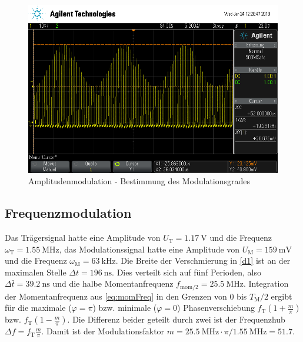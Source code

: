\begin{figure}
	\centering
	\includegraphics[width=\textwidth]{img/c_scope_247.png}
	\caption{Amplitudenmodulation - Bestimmung des Modulationsgrades}
	\label{c2}
\end{figure}

\subsection{Frequenzmodulation}

Das Trägersignal hatte eine Amplitude von $U_\text{T}=\SI{1.17}{\volt}$ und die Frequenz $\omega_\text{T}=\SI{1.55}{\mega\hertz}$, das Modulationssignal hatte eine Amplitude von $U_\text{M}=\SI{159}{\milli\volt}$ und die Frequenz $\omega_\text{M}=\SI{63}{\kilo\hertz}$. Die Breite der Verschmierung in \autoref{d1} ist an der maximalen Stelle $\Delta t = \SI{196}{\nano\second}$. Dies verteilt sich auf fünf Perioden, also $\Delta \bar{t} = \SI{39.2}{\nano\second}$ und die halbe Momentanfrequenz $f_\text{mom/2} = \SI{25.5}{\mega\hertz}$. Integration der Momentanfrequenz aus \autoref{eq:momFreq} in den Grenzen von $0$ bis $T_\text{M}/2$ ergibt für die maximale ($\varphi = \pi$) bzw. minimale ($\varphi = 0$) Phasenverschiebung $f_\text{T}\left(1 + \frac{m}{\pi}\right)$ bzw. $f_\text{T}\left(1 - \frac{m}{\pi}\right)$. Die Differenz beider geteilt durch zwei ist der Frequenzhub $\Delta f = f_\text{T} \frac{m}{\pi}$. Damit ist der Modulationsfaktor $m = \SI{25.5}{\mega\hertz} \cdot \pi / \SI{1.55}{\mega\hertz} = 51.7$.

